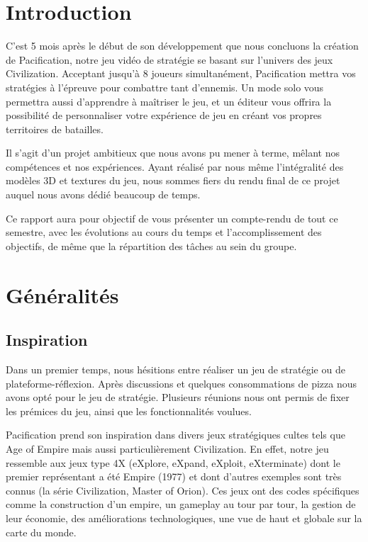 \documentclass[12pt]{report}
\begin{document}
\chapter{Introduction}

C’est 5 mois après le début de son développement que nous concluons la création
de Pacification, notre jeu vidéo de stratégie se basant sur l’univers des jeux
Civilization. Acceptant jusqu'à 8 joueurs simultanément, Pacification mettra vos
stratégies à l’épreuve pour combattre tant d’ennemis. Un mode solo vous
permettra aussi d’apprendre à maîtriser le jeu, et un éditeur vous offrira la
possibilité de personnaliser votre expérience de jeu en créant vos propres
territoires de batailles.

Il s’agit d’un projet ambitieux que nous avons pu mener à terme, mêlant nos
compétences et nos expériences. Ayant réalisé par nous même l’intégralité des
modèles 3D et textures du jeu, nous sommes fiers du rendu final de ce projet
auquel nous avons dédié beaucoup de temps.

Ce rapport aura pour objectif de vous présenter un compte-rendu de tout ce
semestre, avec les évolutions au cours du temps et l'accomplissement des
objectifs, de même que la répartition des tâches au sein du groupe.

\chapter{Généralités}

\section{Inspiration}

Dans un premier temps, nous hésitions entre réaliser un jeu de stratégie ou de
plateforme-réflexion. Après discussions et quelques consommations de pizza nous
avons opté pour le jeu de stratégie. Plusieurs réunions nous ont permis de fixer
les prémices du jeu, ainsi que les fonctionnalités voulues.

Pacification prend son inspiration dans divers jeux stratégiques cultes tels que
Age of Empire mais aussi particulièrement Civilization. En effet, notre jeu
ressemble aux jeux type 4X (eXplore, eXpand, eXploit, eXterminate) dont le
premier représentant a été Empire (1977) et dont d’autres exemples sont très
connus (la série Civilization, Master of Orion). Ces jeux ont des codes
spécifiques comme la construction d’un empire, un gameplay au tour par tour, la
gestion de leur économie, des améliorations technologiques, une vue de haut et
globale sur la carte du monde. 
\end{document}
